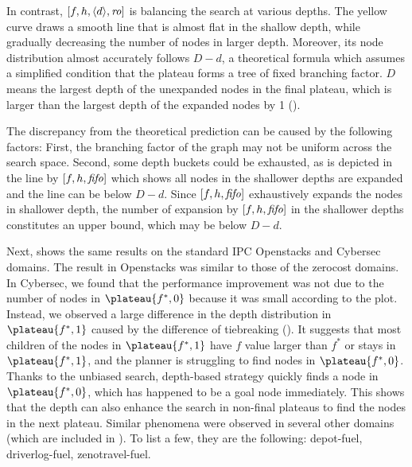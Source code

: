In contrast, $[f,h,{\left<d\right>},{\text{\textit{ro}}}]$ is balancing the search at various depths.
The yellow curve draws a smooth line that is almost flat in the shallow depth, while gradually decreasing the number of nodes in larger depth.
Moreover, its node distribution almost accurately follows $D-d$, a theoretical formula which assumes a simplified
condition that the plateau forms a tree of fixed branching factor.
$D$ means the largest depth of the unexpanded nodes in the final plateau, which is
larger than the largest depth of the expanded nodes by 1
().

The discrepancy from the theoretical prediction can be caused by the 
following factors: First, the branching factor of the graph may not be
uniform across the search space. Second, some depth buckets could be
exhausted, as is depicted in the line by $[f,h,{\text{\textit{fifo}}}]$ which
shows all nodes in the shallower depths are expanded and the line can be below $D-d$.
Since $[f,h,{\text{\textit{fifo}}}]$ exhaustively expands the nodes in shallower depth,
the number of expansion by $[f,h,{\text{\textit{fifo}}}]$ in the shallower depths constitutes an upper bound, which may be below $D-d$.

Next,  shows the same results on the standard IPC
Openstacks and Cybersec domains.
The result in Openstacks was similar to those of the zerocost domains.
In Cybersec,
we found that the performance improvement was not due to the number of nodes in $\plateau{f^*,0}$ because it was small according to the plot.
Instead, we observed a large difference in the depth distribution in $\plateau{f^*,1}$ caused by the difference of tiebreaking ().
It suggests that most children of the nodes in $\plateau{f^*,1}$ have $f$ value larger than $f^*$ or stays in $\plateau{f^*,1}$, and the planner is struggling to find nodes in $\plateau{f^*,0}$.
Thanks to the unbiased search, depth-based strategy quickly finds a node in $\plateau{f^*,0}$, which has happened to be a goal node immediately.
This shows that the depth can also enhance the search in non-final plateaus to find the nodes in the next plateau.
Similar phenomena were observed in several other domains (which are included in ). To list a few, they are the following: depot-fuel, driverlog-fuel, zenotravel-fuel.

